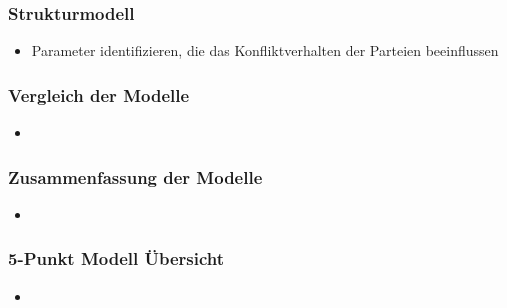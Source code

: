 \documentclass[12pt,a4paper]{beamer}
\begin{document}
\begin{frame}
	\frametitle{Strukturmodell}
	\begin{itemize}
		\item Parameter identifizieren, die das Konfliktverhalten der Parteien beeinflussen 
	\end{itemize}
\end{frame}


\begin{frame}
	\frametitle{Vergleich der Modelle}
	\begin{itemize}
		\item 
	\end{itemize}
\end{frame}

\begin{frame}
	\frametitle{Zusammenfassung der Modelle}
	\begin{itemize}
		\item 
	\end{itemize}
\end{frame}

\begin{frame}
	\frametitle{5-Punkt Modell Übersicht}
	\begin{itemize}
		\item 
	\end{itemize}
\end{frame}


\end{document}
